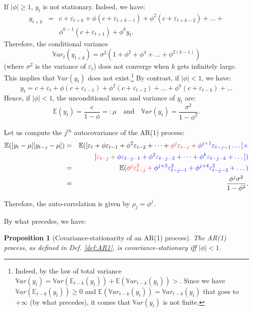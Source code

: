 \documentclass[
  12pt,
]{book}
\newtheorem{proposition}{Proposition}[chapter]
\theoremstyle{definition}
\theoremstyle{definition}
\theoremstyle{definition}
\theoremstyle{definition}
\theoremstyle{remark}
\begin{document}
If \(|\phi|\ge1\), \(y_t\) is not stationary. Indeed, we have:
\begin{eqnarray*}
y_{t+k} &=& c + \varepsilon_{t+k} + \phi  ( c + \varepsilon_{t+k-1})+ \phi^2  ( c + \varepsilon_{t+k-2})+ \dots + \\
&& \phi^{k-1}  ( c + \varepsilon_{t+1}) + \phi^k y_t.
\end{eqnarray*}
Therefore, the conditional variance
\[
\mathbb{V}ar_t(y_{t+k}) = \sigma^2(1 + \phi^2 + \phi^4 + \dots + \phi^{2(k-1)})
\]
(where \(\sigma^2\) is the variance of \(\varepsilon_t\)) does not converge when \(k\) gets infinitely large. This implies that \(\mathbb{V}ar(y_{t})\) does not exist.\footnote{Indeed, by the law of total variance \(\mathbb{V}ar(y_{t})=\mathbb{V}ar(\mathbb{E}_{t-k}(y_{t}))+\mathbb{E}(\mathbb{V}ar_{t-k}(y_{t}))>\). Since we have \(\mathbb{V}ar(\mathbb{E}_{t-k}(y_{t})) \ge 0\) and \(\mathbb{E}(\mathbb{V}ar_{t-k}(y_{t}))=\mathbb{V}ar_{t-k}(y_{t})\) that goes to \(+\infty\) (by what precedes), it comes that \(\mathbb{V}ar(y_{t})\) is not finite.} By contrast, if \(|\phi| < 1\), we have:
\[
y_t = c + \varepsilon_t + \phi  ( c + \varepsilon_{t-1})+ \phi^2  ( c + \varepsilon_{t-2})+ \dots + \phi^k  ( c + \varepsilon_{t-k}) + \dots
\]
Hence, if \(|\phi| < 1\), the unconditional mean and variance of \(y_t\) are:
\[
\mathbb{E}(y_t) = \frac{c}{1-\phi} =: \mu \quad \mbox{and} \quad \mathbb{V}ar(y_t) = \frac{\sigma^2}{1-\phi^2}.
\]

Let us compute the \(j^{th}\) autocovariance of the AR(1) process:
\begin{eqnarray*}
\mathbb{E}([y_{t} - \mu][y_{t-j} - \mu]) &=& \mathbb{E}([\varepsilon_t + \phi  \varepsilon_{t-1}+ \phi^2 \varepsilon_{t-2} + \dots + \color{red}{\phi^j \varepsilon_{t-j}} + \color{blue}{\phi^{j+1} \varepsilon_{t-j-1}} \dots]\times \\
&&[\color{red}{\varepsilon_{t-j}} + \color{blue}{\phi \varepsilon_{t-j-1}} + \phi^2 \varepsilon_{t-j-2} + \dots + \phi^k \varepsilon_{t-j-k} + \dots])\\
&=& \mathbb{E}(\color{red}{\phi^j \varepsilon_{t-j}^2}+\color{blue}{\phi^{j+2} \varepsilon_{t-j-1}^2}+\phi^{j+4} \varepsilon_{t-j-2}^2+\dots)\\
&=& \frac{\phi^j \sigma^2}{1 - \phi^2}.
\end{eqnarray*}

Therefore, the auto-correlation is given by \(\rho_j = \phi^j\).

By what precedes, we have:

\begin{proposition}[Covariance-stationarity of an AR(1) process]
\protect\hypertarget{prp:statioAR1}{}\label{prp:statioAR1}The AR(1) process, as defined in Def. \ref{def:AR1}, is covariance-stationary iff \(|\phi|<1\).
\end{proposition}
\end{document}
